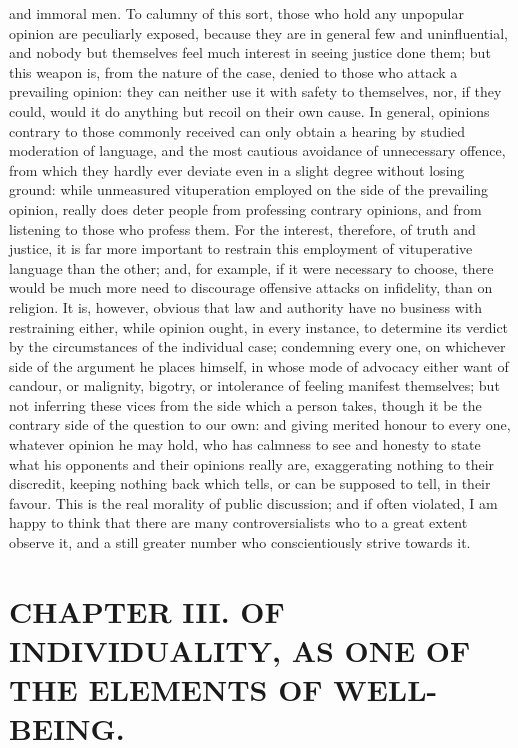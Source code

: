 \documentclass[12pt]{article}
\begin{document}
and immoral men. To calumny of this sort, those who hold any unpopular opinion are peculiarly exposed, because they are in general few and uninfluential, and nobody but themselves feel much interest in seeing justice done them; but this weapon is, from the nature of the case, denied to those who attack a prevailing opinion: they can neither use it with safety to themselves, nor, if they could, would it do anything but recoil on their own cause. In general, opinions contrary to those commonly received can only obtain a hearing by studied moderation of language, and the most cautious avoidance of unnecessary offence, from which they hardly ever deviate even in a slight degree without losing ground: while unmeasured vituperation employed on the side of the prevailing opinion, really does deter people from professing contrary opinions, and from listening to those who profess them. For the interest, therefore, of truth and justice, it is far more important to restrain this employment of vituperative language than the other; and, for example, if it were necessary to choose, there would be much more need to discourage offensive attacks on infidelity, than on religion. It is, however, obvious that law and authority have no business with restraining either, while opinion ought, in every instance, to determine its verdict by the circumstances of the individual case; condemning every one, on whichever side of the argument he places himself, in whose mode of advocacy either want of candour, or malignity, bigotry, or intolerance of feeling manifest themselves; but not inferring these vices from the side which a person takes, though it be the contrary side of the question to our own: and giving merited honour to every one, whatever opinion he may hold, who has calmness to see and honesty to state what his opponents and their opinions really are, exaggerating nothing to their discredit, keeping nothing back which tells, or can be supposed to tell, in their favour. This is the real morality of public discussion; and if often violated, I am happy to think that there are many controversialists who to a great extent observe it, and a still greater number who conscientiously strive towards it.

\section*{CHAPTER III. OF INDIVIDUALITY, AS ONE OF THE ELEMENTS OF WELL-BEING.}
\end{document}
